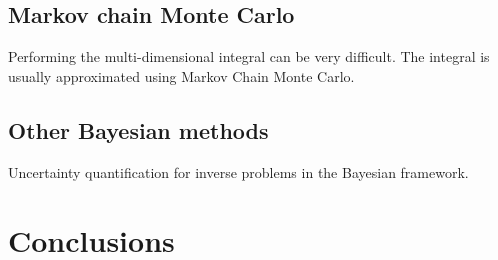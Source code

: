 \subsection{Markov chain Monte Carlo}
Performing the multi-dimensional integral can be very difficult. The integral is usually approximated using Markov Chain Monte Carlo.

\subsection{Other Bayesian methods}
Uncertainty quantification for inverse problems in the Bayesian framework.



\section{Conclusions}